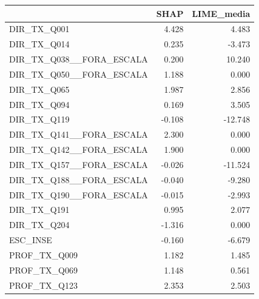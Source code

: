 \begin{tabular}{lrr}
\toprule
 & SHAP & LIME\_media \\
\midrule
DIR\_TX\_Q001 & 4.428 & 4.483 \\
DIR\_TX\_Q014 & 0.235 & -3.473 \\
DIR\_TX\_Q038\_\_FORA\_ESCALA & 0.200 & 10.240 \\
DIR\_TX\_Q050\_\_FORA\_ESCALA & 1.188 & 0.000 \\
DIR\_TX\_Q065 & 1.987 & 2.856 \\
DIR\_TX\_Q094 & 0.169 & 3.505 \\
DIR\_TX\_Q119 & -0.108 & -12.748 \\
DIR\_TX\_Q141\_\_FORA\_ESCALA & 2.300 & 0.000 \\
DIR\_TX\_Q142\_\_FORA\_ESCALA & 1.900 & 0.000 \\
DIR\_TX\_Q157\_\_FORA\_ESCALA & -0.026 & -11.524 \\
DIR\_TX\_Q188\_\_FORA\_ESCALA & -0.040 & -9.280 \\
DIR\_TX\_Q190\_\_FORA\_ESCALA & -0.015 & -2.993 \\
DIR\_TX\_Q191 & 0.995 & 2.077 \\
DIR\_TX\_Q204 & -1.316 & 0.000 \\
ESC\_INSE & -0.160 & -6.679 \\
PROF\_TX\_Q009 & 1.182 & 1.485 \\
PROF\_TX\_Q069 & 1.148 & 0.561 \\
PROF\_TX\_Q123 & 2.353 & 2.503 \\
\bottomrule
\end{tabular}
